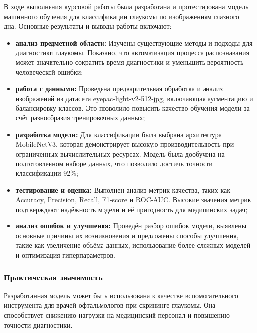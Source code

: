 {\vspace{13pt}
    В ходе выполнения курсовой работы была разработана и протестирована модель машинного обучения для классификации глаукомы по изображениям глазного дна. Основные результаты и выводы работы включают:

    \begin{itemize}
        \item \textbf{анализ предметной области:} Изучены существующие методы и подходы для диагностики глаукомы. Показано, что автоматизация процесса распознавания может значительно сократить время диагностики и уменьшить вероятность человеческой ошибки;
        
        \item \textbf{работа с данными:} Проведена предварительная обработка и анализ изображений из датасета eyepac-light-v2-512-jpg, включающая аугментацию и балансировку классов. Это позволило повысить качество обучения модели за счёт разнообразия тренировочных данных;

        \item \textbf{разработка модели:} Для классификации была выбрана архитектура MobileNetV3, которая демонстрирует высокую производительность при ограниченных вычислительных ресурсах. Модель была дообучена на подготовленном наборе данных, что позволило достичь точности классификации 92\%;

        \item \textbf{тестирование и оценка:} Выполнен анализ метрик качества, таких как Accuracy, Precision, Recall, F1-score и ROC-AUC. Высокие значения метрик подтверждают надёжность модели и её пригодность для медицинских задач;

        \item \textbf{анализ ошибок и улучшения:} Проведён разбор ошибок модели, выявлены основные причины их возникновения и предложены способы улучшения, такие как увеличение объёма данных, использование более сложных моделей и оптимизация гиперпараметров.

    \end{itemize}

    \subsubsection*{Практическая значимость}

    Разработанная модель может быть использована в качестве вспомогательного инструмента для врачей-офтальмологов при скрининге глаукомы. Она способствует снижению нагрузки на медицинский персонал и повышению точности диагностики. 

}
